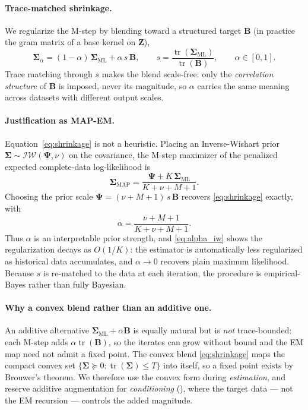 \paragraph{Trace-matched shrinkage.}
We regularize the M-step by blending toward a structured target $\mathbf{B}$ (in
practice the gram matrix of a base kernel on $\mathbf{Z}$),
\begin{equation}
\label{eq:shrinkage}
    \boldsymbol{\Sigma}_\alpha
    = (1-\alpha)\,\boldsymbol{\Sigma}_{\text{ML}}
    + \alpha\, s\, \mathbf{B},
    \qquad
    s = \frac{\operatorname{tr}(\boldsymbol{\Sigma}_{\text{ML}})}{\operatorname{tr}(\mathbf{B})},
    \qquad \alpha \in [0,1].
\end{equation}
Trace matching through $s$ makes the blend scale-free: only the \emph{correlation
structure} of $\mathbf{B}$ is imposed, never its magnitude, so $\alpha$ carries
the same meaning across datasets with different output scales.

\paragraph{Justification as MAP-EM.}
Equation~\eqref{eq:shrinkage} is not a heuristic. Placing an Inverse-Wishart
prior $\boldsymbol{\Sigma}\sim\mathcal{IW}(\boldsymbol{\Psi},\nu)$ on the
covariance, the M-step maximizer of the penalized expected complete-data
log-likelihood is
\begin{equation}
    \boldsymbol{\Sigma}_{\text{MAP}}
    = \frac{\boldsymbol{\Psi} + K\,\boldsymbol{\Sigma}_{\text{ML}}}{K + \nu + M + 1}.
\end{equation}
Choosing the prior scale $\boldsymbol{\Psi} = (\nu + M + 1)\, s\, \mathbf{B}$
recovers \eqref{eq:shrinkage} exactly, with
\begin{equation}
\label{eq:alpha_iw}
    \alpha = \frac{\nu + M + 1}{K + \nu + M + 1}.
\end{equation}
Thus $\alpha$ is an interpretable prior strength, and \eqref{eq:alpha_iw} shows
the regularization decays as $O(1/K)$: the estimator is automatically less
regularized as historical data accumulates, and $\alpha\to 0$ recovers plain
maximum likelihood. Because $s$ is re-matched to the data at each iteration, the
procedure is empirical-Bayes rather than fully Bayesian.

\paragraph{Why a convex blend rather than an additive one.}
An additive alternative $\boldsymbol{\Sigma}_{\text{ML}} + \alpha\mathbf{B}$ is
equally natural but is \emph{not} trace-bounded: each M-step adds
$\alpha\operatorname{tr}(\mathbf{B})$, so the iterates can grow without bound and
the EM map need not admit a fixed point. The convex blend \eqref{eq:shrinkage}
maps the compact convex set
$\{\boldsymbol{\Sigma}\succeq 0 : \operatorname{tr}(\boldsymbol{\Sigma})\le T\}$
into itself, so a fixed point exists by Brouwer's theorem. We therefore use the
convex form during \emph{estimation}, and reserve additive augmentation for
\emph{conditioning} (), where the target data --- not the
EM recursion --- controls the added magnitude.

